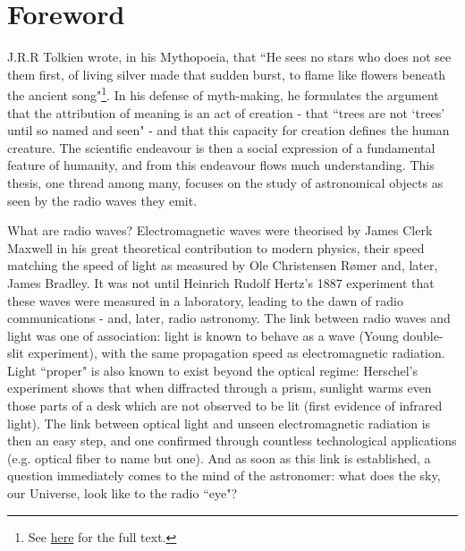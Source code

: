 \chapter*{Foreword}

\pg
J.R.R Tolkien wrote, in his Mythopoeia, that ``He sees no stars who does not see them first, of living silver made that sudden burst, to flame like flowers beneath the ancient song"\footnote{See \href{http://home.agh.edu.pl/~evermind/jrrtolkien/mythopoeia.htm}{here} for the full text.}. In his defense of myth-making, he formulates the argument that the attribution of meaning is an act of creation - that ``trees are not `trees' until so named and seen" - and that this capacity for creation defines the human creature. The scientific endeavour is then a social expression of a fundamental feature of humanity, and from this endeavour flows much understanding. This thesis, one thread among many, focuses on the study of astronomical objects as seen by the radio waves they emit.

\pg
What are radio waves? Electromagnetic waves were theorised by James Clerk Maxwell \citep{maxwell} in his great theoretical contribution to modern physics, their speed matching the speed of light as measured by Ole Christensen R\o mer and, later, James Bradley. It was not until Heinrich Rudolf Hertz's 1887 experiment that these waves were measured in a laboratory, leading to the dawn of radio communications - and, later, radio astronomy. The link between radio waves and light was one of association: light is known to behave as a wave (Young double-slit experiment), with the same propagation speed as electromagnetic radiation. Light ``proper" is also known to exist beyond the optical regime: Herschel's experiment shows that when diffracted through a prism, sunlight warms even those parts of a desk which are not observed to be lit (first evidence of infrared light). The link between optical light and unseen electromagnetic radiation is then an easy step, and one confirmed through countless technological applications (e.g. optical fiber to name but one). And as soon as this link is established, a question immediately comes to the mind of the astronomer: what does the sky, our Universe, look like to the radio ``eye"?

